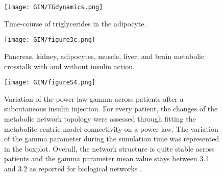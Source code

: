 \begin{figure}[!htp]
\centering
	\texttt{[image: GIM/TGdynamics.png]}%
	\caption[Time-course of triglycerides in the adipocytes.]{Time-course of triglycerides in the adipocyte.}
	\label{fig:GIM3b}
\end{figure}

\begin{figure}[!htp]
\centering
	\texttt{[image: GIM/figure3c.png]}%
	\caption[Insulin induced inter-organ cross-talk.]{Pancreas, kidney, adipocytes, muscle, liver, and brain metabolic crosstalk with and without insulin action.}
	\label{fig:GIM3c}
\end{figure}


\begin{figure}[!htp]
\centering
	\texttt{[image: GIM/figureS4.png]}%
	\caption[Variation of the power law gamma across patients after a subcuetanous insulin injection.]{Variation of the power law gamma across patients after a subcutaneous insulin injection. For every patient, the changes of the metabolic network topology were assessed through fitting the metabolite-centric model connectivity on a power law. The variation of the gamma parameter during the simulation time was represented in the boxplot. Overall, the network structure is quite stable across patients and the gamma parameter mean value stays between 3.1 and 3.2 as reported for biological networks \cite{ravasz2002hierarchical}.}
	\label{fig:s4GIM}
\end{figure}

